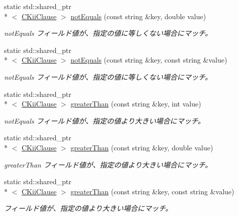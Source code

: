 \begin{DoxyCompactItemize}
static std\-::shared\-\_\-ptr\\*
$<$ \hyperlink{class_c_kii_clause}{C\-Kii\-Clause} $>$ \hyperlink{class_c_kii_clause_a852def0f04ce641ecb34691c30763803}{not\-Equals} (const string \&key, double value)
\begin{DoxyCompactList}\small\item\em not\-Equals フィールド値が、指定の値に等しくない場合にマッチ。 \end{DoxyCompactList}\item 
static std\-::shared\-\_\-ptr\\*
$<$ \hyperlink{class_c_kii_clause}{C\-Kii\-Clause} $>$ \hyperlink{class_c_kii_clause_af581fa5e81a7003eacf27cda974ec119}{not\-Equals} (const string \&key, const string \&value)
\begin{DoxyCompactList}\small\item\em not\-Equals フィールド値が、指定の値に等しくない場合にマッチ。 \end{DoxyCompactList}\item 
static std\-::shared\-\_\-ptr\\*
$<$ \hyperlink{class_c_kii_clause}{C\-Kii\-Clause} $>$ \hyperlink{class_c_kii_clause_ab3e8e71ab31fa53efa7c828516325cc0}{greater\-Than} (const string \&key, int value)
\begin{DoxyCompactList}\small\item\em not\-Equals フィールド値が、指定の値より大きい場合にマッチ。 \end{DoxyCompactList}\item 
static std\-::shared\-\_\-ptr\\*
$<$ \hyperlink{class_c_kii_clause}{C\-Kii\-Clause} $>$ \hyperlink{class_c_kii_clause_a782d42431601d16608f99070ef347c6b}{greater\-Than} (const string \&key, double value)
\begin{DoxyCompactList}\small\item\em greater\-Than フィールド値が、指定の値より大きい場合にマッチ。 \end{DoxyCompactList}\item 
static std\-::shared\-\_\-ptr\\*
$<$ \hyperlink{class_c_kii_clause}{C\-Kii\-Clause} $>$ \hyperlink{class_c_kii_clause_a7f36064e49d85516c86b915ff20402b9}{greater\-Than} (const string \&key, const string \&value)
\begin{DoxyCompactList}\small\item\em フィールド値が、指定の値より大きい場合にマッチ。 \end{DoxyCompactList}\item 

\end{DoxyCompactItemize}
